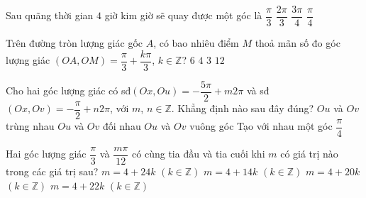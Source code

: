 \begin{ex}%
	Sau quãng thời gian $4$ giờ kim giờ sẽ quay được một góc là 
	\choice 
		{$\dfrac{\pi}{3}$} 
		{\True  $\dfrac{2\pi}{3}$}
		{$\dfrac{3\pi}{4}$} 
		 {$\dfrac{\pi}{4}$}
\end{ex}

\begin{ex}%
	Trên đường  tròn lượng giác gốc $A$, có bao nhiêu điểm $M$ thoả mãn số đo góc lượng giác $\left(OA,OM\right) = \dfrac{\pi}{3} + \dfrac{k\pi}{3}$, $ k\in \mathbb{Z}$?
	 \choice
		{\True  $6$}
		 {$4$}
		 {$3$}
		 {$12$}
\end{ex}

\begin{ex}%
	Cho hai góc lượng giác có sđ$\left(Ox,Ou\right)=-\dfrac{5\pi}{2}+m2\pi$  và sđ$\left(Ox,Ov\right)=-\dfrac{\pi}{2}+n2\pi$, với $m$, $ n\in \mathbb{Z}$. Khẳng định nào sau đây đúng?
	 \choice
		{\True  $Ou$ và $Ov$ trùng nhau}
		{$Ou$ và  $Ov$ đối nhau}
		{$Ou$ và $Ov$ vuông góc} 
		 {Tạo với nhau một góc $\dfrac{\pi}{4}$}
\end{ex}

\begin{ex}%
	Hai góc lượng giác $\dfrac{\pi}{3}$ và $\dfrac{m \pi}{12}$  có cùng tia đầu và tia cuối khi $m$ có giá trị nào trong các giá trị sau?
	 \choice
		 {\True $m=4+24k$ $(k\in \mathbb{Z})$}
		{$m=4+14k$ $(k\in  \mathbb{Z})$}
		{$m=4+20k$  $(k\in \mathbb{Z})$}
		{$m=4+22k$ $(k\in  \mathbb{Z})$}
\end{ex}

